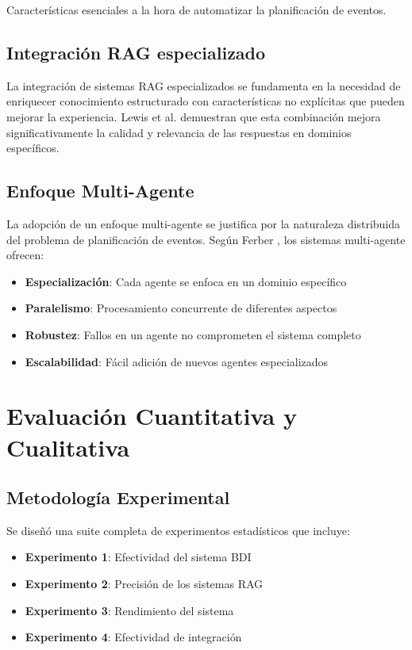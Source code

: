 \documentclass[runningheads,a4paper]{llncs}
\begin{document}
Características esenciales a la hora de automatizar la planificación de eventos.

\subsection{Integración RAG especializado}

La integración de sistemas RAG especializados se fundamenta en la necesidad de enriquecer conocimiento estructurado con características no explícitas que pueden mejorar la experiencia. Lewis et al. \cite{lewis2020retrieval} demuestran que esta combinación mejora significativamente la calidad y relevancia de las respuestas en dominios específicos.

\subsection{Enfoque Multi-Agente}

La adopción de un enfoque multi-agente se justifica por la naturaleza distribuida del problema de planificación de eventos. Según Ferber \cite{ferber1999multi}, los sistemas multi-agente ofrecen:

\begin{itemize}
    \item \textbf{Especialización}: Cada agente se enfoca en un dominio específico
    \item \textbf{Paralelismo}: Procesamiento concurrente de diferentes aspectos
    \item \textbf{Robustez}: Fallos en un agente no comprometen el sistema completo
    \item \textbf{Escalabilidad}: Fácil adición de nuevos agentes especializados
\end{itemize}

\section{Evaluación Cuantitativa y Cualitativa}

\subsection{Metodología Experimental}

Se diseñó una suite completa de experimentos estadísticos que incluye:

\begin{itemize}
    \item \textbf{Experimento 1}: Efectividad del sistema BDI
    \item \textbf{Experimento 2}: Precisión de los sistemas RAG
    \item \textbf{Experimento 3}: Rendimiento del sistema
    \item \textbf{Experimento 4}: Efectividad de integración
\end{itemize}
\end{document}
